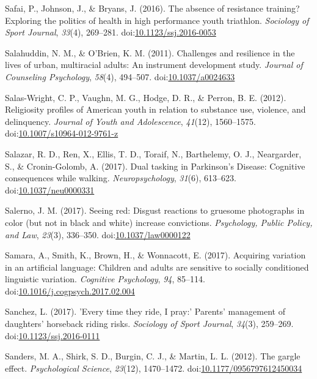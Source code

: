\documentclass[english,man]{apa6}
\theoremstyle{definition}
\theoremstyle{definition}
\theoremstyle{definition}
\theoremstyle{remark}
\begin{document}
\hypertarget{ref-Safai2016}{}
Safai, P., Johnson, J., \& Bryans, J. (2016). The absence of resistance
training? Exploring the politics of health in high performance youth
triathlon. \emph{Sociology of Sport Journal}, \emph{33}(4), 269--281.
doi:\href{https://doi.org/10.1123/ssj.2016-0053}{10.1123/ssj.2016-0053}

\hypertarget{ref-Salahuddin2011}{}
Salahuddin, N. M., \& O'Brien, K. M. (2011). Challenges and resilience
in the lives of urban, multiracial adults: An instrument development
study. \emph{Journal of Counseling Psychology}, \emph{58}(4), 494--507.
doi:\href{https://doi.org/10.1037/a0024633}{10.1037/a0024633}

\hypertarget{ref-Salas-Wright2012}{}
Salas-Wright, C. P., Vaughn, M. G., Hodge, D. R., \& Perron, B. E.
(2012). Religiosity profiles of American youth in relation to substance
use, violence, and delinquency. \emph{Journal of Youth and Adolescence},
\emph{41}(12), 1560--1575.
doi:\href{https://doi.org/10.1007/s10964-012-9761-z}{10.1007/s10964-012-9761-z}

\hypertarget{ref-Salazar2017}{}
Salazar, R. D., Ren, X., Ellis, T. D., Toraif, N., Barthelemy, O. J.,
Neargarder, S., \& Cronin-Golomb, A. (2017). Dual tasking in Parkinson's
Disease: Cognitive consequences while walking. \emph{Neuropsychology},
\emph{31}(6), 613--623.
doi:\href{https://doi.org/10.1037/neu0000331}{10.1037/neu0000331}

\hypertarget{ref-Salerno2017}{}
Salerno, J. M. (2017). Seeing red: Disgust reactions to gruesome
photographs in color (but not in black and white) increase convictions.
\emph{Psychology, Public Policy, and Law}, \emph{23}(3), 336--350.
doi:\href{https://doi.org/10.1037/law0000122}{10.1037/law0000122}

\hypertarget{ref-Samara2017}{}
Samara, A., Smith, K., Brown, H., \& Wonnacott, E. (2017). Acquiring
variation in an artificial language: Children and adults are sensitive
to socially conditioned linguistic variation. \emph{Cognitive
Psychology}, \emph{94}, 85--114.
doi:\href{https://doi.org/10.1016/j.cogpsych.2017.02.004}{10.1016/j.cogpsych.2017.02.004}

\hypertarget{ref-Sanchez2016}{}
Sanchez, L. (2017). 'Every time they ride, I pray:' Parents' management
of daughters' horseback riding risks. \emph{Sociology of Sport Journal},
\emph{34}(3), 259--269.
doi:\href{https://doi.org/10.1123/ssj.2016-0111}{10.1123/ssj.2016-0111}

\hypertarget{ref-Sanders2012}{}
Sanders, M. A., Shirk, S. D., Burgin, C. J., \& Martin, L. L. (2012).
The gargle effect. \emph{Psychological Science}, \emph{23}(12),
1470--1472.
doi:\href{https://doi.org/10.1177/0956797612450034}{10.1177/0956797612450034}
\end{document}
